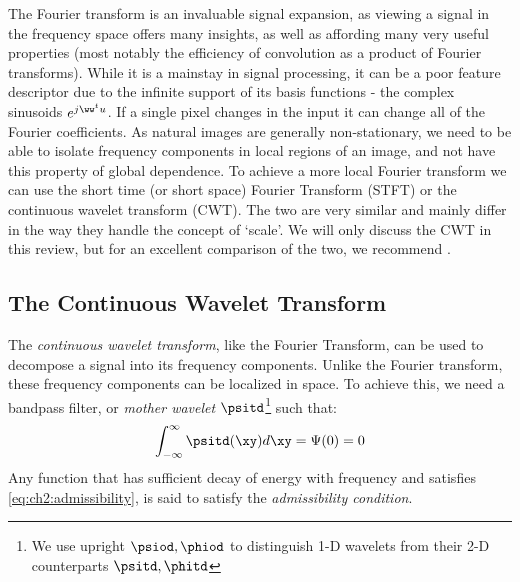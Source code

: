 The Fourier transform is an invaluable signal expansion, as viewing a signal in
the frequency space offers many insights, as well as affording many very useful
properties (most notably the efficiency of convolution as a product of Fourier
transforms). While it is a mainstay in signal processing,
it can be a poor
feature descriptor due to the infinite support of its basis functions - the
complex sinusoids $e^{j\ww^t u}$. If
a single pixel changes in the input it can change all of the
Fourier coefficients. As natural images are generally non-stationary, we need
to be able to isolate frequency components in local regions of an image, and
not have this property of global dependence. To achieve a more local Fourier
transform we can use the short time (or short space) Fourier Transform (STFT) or the
continuous wavelet transform (CWT). The two are very similar and mainly differ in the
way they handle the concept of `scale'. We will only discuss the CWT in this review,
but for an excellent comparison of the two, we recommend \cite[Chapter~1]{antoine_two-dimensional_2004}.


\subsection{The Continuous Wavelet Transform}
The \emph{continuous wavelet transform}, like the Fourier Transform, can be used
to decompose a signal into its frequency components. Unlike the Fourier
transform, these frequency components can be localized in space. To
achieve this, we need a bandpass filter, or \emph{mother wavelet}
$\psitd$\footnote{We use upright $\psiod, \phiod$ to distinguish 1-D wavelets
from their 2-D counterparts $\psitd, \phitd$} such that:
\begin{equation}
  \int_{-\infty}^{\infty} \psitd(\xy) d\xy = \Psi(0) = 0\label{eq:ch2:admissibility}
\end{equation}
Any function that has sufficient decay of energy with frequency and satisfies
\eqref{eq:ch2:admissibility}, is said to satisfy the \emph{admissibility condition}.

